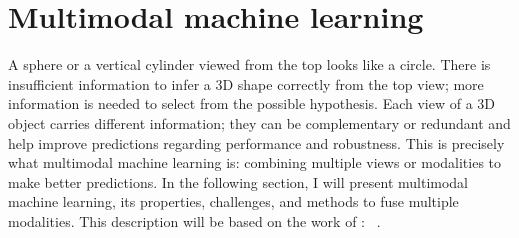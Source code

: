 \documentclass[../main.tex]{subfiles}
\begin{document}
\section{Multimodal machine learning}
	A sphere or a vertical cylinder viewed from the top looks like a circle.
	There is insufficient information to infer a 3D shape correctly from the top view; more information is needed to select from the possible hypothesis.
	Each view of a 3D object carries different information; they can be complementary or redundant and help improve predictions regarding performance and robustness.
	This is precisely what multimodal machine learning is: combining multiple views or modalities to make better predictions.
	In the following section, I will present multimodal machine learning, its properties, challenges, and methods to fuse multiple modalities.
	This description will be based on the work of \citeauthor{MML_morency}: ~\cite{MML_morency}.
\end{document}
